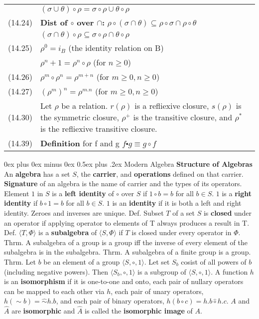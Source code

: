 \documentclass[letterpaper, 8pt]{extarticle}
\makeatletter
\renewcommand{\section}{\@startsection{section}{1}{0mm}%
                                {0ex plus 0ex minus 0ex}%
                                {0.5ex plus .2ex}%
                                {\normalfont\normalsize\bfseries}}
\makeatother
\begin{document}
\begin{multicols*}{3}
\begin{tabulary}{\linewidth}{@{}lLL@{}}
        &  $(\sigma \cup \theta) \circ \rho = \sigma \circ \rho \cup \theta \circ \rho$&\\
        (14.24) & \textbf{Dist of $\circ$ over $\cap$:} \; $\rho \circ (\sigma \cap \theta) \subseteq \rho \circ \sigma \cap \rho \circ \theta$&\\
        &  $(\sigma \cap \theta) \circ \rho \subseteq \sigma \circ \rho \cap \theta \circ \rho$&\\
        (14.25) & $\rho^0 = i_B$ (the identity relation on B)\\
        &  $\rho^n+1 = \rho^n \circ \rho$ (for $n \geq 0$)&\\
        (14.26) & $\rho^m \circ \rho^n = \rho^{m+n}$ (for $m \geq 0,n \geq 0$) &\\
        (14.27) & $(\rho^m)^n = \rho^{m.n}$ (for $m \geq 0,n \geq 0$) &\\
        (14.30) &Let $\rho$ be a relation. $r(\rho)$ is a refliexive closure, $s(\rho)$ is the symmetric closure, $\rho^+$ is the transitive closure, and $\rho^*$ is the refliexive transitive closure.& \\
        (14.39) &\textbf{Definition} for f and g $f \centerdot g \equiv g \circ f$ &\\
    \end{tabulary}

    \section{Modern Algebra}
    \textbf{Structure of Algebras}
    An \textbf{algebra} has a set $S$, the \textbf{carrier},
    and \textbf{operations} defined on that carrier.
    \textbf{Signature} of an algebra is the name of carrier and the types of its operators.
    Element $1$ in $S$ is a \textbf{left identity} of $\circ$ over $S$
    if $1 \circ b = b$ for all $b \in S$.
    $1$ is a \textbf{right identity} if $b \circ 1 = b$ for all $b \in S$.
    $1$ is an \textbf{identity} if it is both a left and right identity.
    Zeroes and inverses are unique.
    Def. Subset $T$ of a set $S$ is \textbf{closed} under an operator
    if applying operator to elements of T always produces a result in T.
    Def. $\langle T, \Phi \rangle$ is a \textbf{subalgebra} of $\langle S, \Phi \rangle$ if $T$ is closed under
    every operator in $\Phi$.
    Thrm. A subalgebra of a group is a group iff the inverse of every element of the subalgebra is in the subalgebra.
    Thrm. A subalgebra of a finite group is a group.
    Thrm. Let $b$ be an element of a group $\langle S, \circ, 1 \rangle$.
    Let set $S_b$ cosist of all powers of $b$ (including negative powers).
    Then $\langle S_b, \circ, 1 \rangle$ is a subgroup of $\langle S, \circ, 1 \rangle$.
    A function $h$ is an \textbf{isomorphism} if it is one-to-one and onto,
    each pair of nullary operators can be mapped to each other via $h$,
    each pair of unary operators, $h(\sim b) = \hat{\sim} h.b$,
    and each pair of binary operators, $h(b \circ c) = h.b \hat{\circ} h.c$.
    $A$ and $\hat{A}$ are \textbf{isomorphic} and $\hat{A}$ is called the \textbf{isomorphic image} of $A$.


\end{multicols*}
\end{document}
